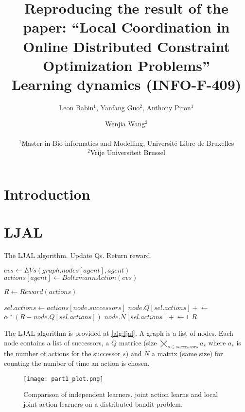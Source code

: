 \documentclass[a4paper, 12pt]{article}
\title{Reproducing the result of the paper: ``Local Coordination in Online Distributed Constraint Optimization Problems'' \citep{Brys2012} \\ \large Learning dynamics (INFO-F-409)}
\author{Leon Babin$^1$, Yanfang Guo$^2$, Anthony Piron$^1$ \and Wenjia Wang$^2$ \\
\mbox{}\\
$^1$Master in Bio-informatics and Modelling, Université Libre de Bruxelles \\
$^2$Vrije Universiteit Brussel}
\begin{document}
\maketitle

\begin{abstract}
  
\end{abstract}

\section{Introduction}


\section{LJAL}

\begin{algorithm}[tph]
  \caption{The LJAL algorithm. Update Qs. Return reward.}
  \label{alg:ljal}
  \begin{algorithmic}[1]
    \State $evs\gets EVs(graph.nodes[agent], agent)$
    \State $actions[agent]\gets BoltzmannAction(evs)$
    \EndFor

    \State $R\gets Reward(actions)$

    \State $sel.actions\gets actions[node.successors]$
    \State $node.Q[sel.actions] \mathrel{+}\gets$
    \State \hspace{1cm}$\alpha * (R - node.Q[sel.actions])$
    \State $node.N[sel.actions]\mathrel{+}\gets 1$
    \EndFor
    \State \Return $R$
    \EndFunction
    \State
    \State {}
    \EndFor
  \end{algorithmic}
\end{algorithm}

The LJAL algorithm is provided at \ref{alg:ljal}. A graph is a list of nodes. Each node contains a list of successors, a $Q$ matrice (size $\bigtimes_{s \in successors} a_s$ where $a_s$ is the number of actions for the successor $s$) and $N$ a matrix (same size) for counting the number of time an action is chosen. 

\begin{figure*}[tp]
  \centering
  \texttt{[image: part1\_plot.png]}
  \caption{Comparison of independent learners, joint action learns and local joint action learners on a distributed bandit problem.}
  \label{fig:part1}
\end{figure*}
\end{document}
